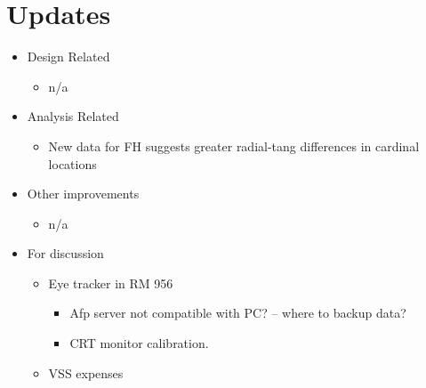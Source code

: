 \documentclass[11pt]{article} %
\begin{document}
\section{Updates} 
\begin{itemize}
\item Design Related
	\begin{itemize}
	\item n/a
	\end{itemize}
\item Analysis Related
	\begin{itemize}
	\item New data for FH suggests greater radial-tang differences in cardinal locations
	\end{itemize}
\item Other improvements
	\begin{itemize}
	\item n/a
	\end{itemize}
\item For discussion
	\begin{itemize}
	\item Eye tracker in RM 956
		\begin{itemize}
			\item{Afp server not compatible with PC? -- where to backup data?}
			\item{CRT monitor calibration.}
		\end{itemize}
	\item VSS expenses
	\end{itemize}
\end{itemize}
\end{document}

